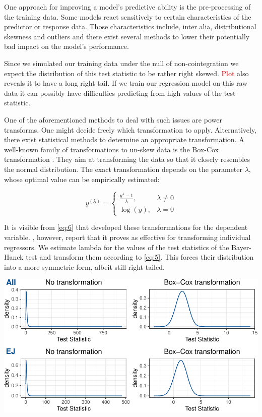 \documentclass[12pt,a4paper]{article}
\let\origfigure\figure
\let\endorigfigure\endfigure
\renewenvironment{figure}[1][2] {
    \expandafter\origfigure\expandafter[H]
} {
    \endorigfigure
}
\begin{document}
One approach for improving a model's predictive ability is the
pre-processing of the training data. Some models react sensitively to
certain characteristics of the predictor or response data. Those
characteristics include, inter alia, distributional skewness and
outliers and there exist several methods to lower their potentially bad
impact on the model's performance.

Since we simulated our training data under the null of non-cointegration
we expect the distribution of this test statistic to be rather right
skewed. \textcolor{red}{Plot} also reveals it to have a long right tail.
If we train our regression model on this raw data it can possibly have
difficulties predicting from high values of the test statistic.

One of the aforementioned methods to deal with such issues are power
transforms. One might decide freely which transformation to apply.
Alternatively, there exist statistical methods to determine an
appropriate transformation. A well-known family of transformations to
un-skew data is the Box-Cox transformation \autocite{Boxcox_1964}. They
aim at transforming the data so that it closely resembles the normal
distribution. The exact transformation depends on the parameter
\(\lambda\), whose optimal value can be empirically estimated:

\begin{equation}
y^{(\lambda)} =
    \begin{cases}
    \frac{y^{\lambda} - 1}{\lambda}, & \lambda \neq 0 \\
    \log{(y)}, & \lambda = 0
    \end{cases}
\label{eq:6}
\end{equation}

It is visible from \eqref{eq:6} that \textcite{Boxcox_1964} developed
these transformations for the dependent variable. \textcite{Kuhn_2013},
however, report that it proves as effective for transforming individual
regressors. We estimate lambda for the values of the test statistics of
the Bayer-Hanck test and transform them according to \eqref{eq:5}. This
forces their distribution into a more symmetric form, albeit still
right-tailed.

\begin{figure}
\centering
\includegraphics{p_approx_paper_files/figure-latex/density_plots-1.pdf}
\caption{\label{fig:density} Untransformed and Box-Cox-transformed
density of the test statistic for test types all and EJ.}
\end{figure}
\end{document}
